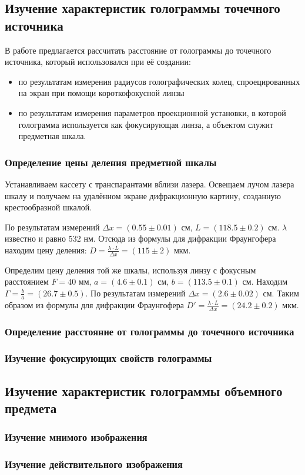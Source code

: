 
\subsection{Изучение характеристик голограммы точечного источника}

    В работе предлагается рассчитать расстояние от голограммы до точечного источника, 
    который использовался при её создании:
    \begin{itemize}
        \item по результатам измерения радиусов голографических колец,
                спроецированных на экран при помощи короткофокусной линзы
        \item по результатам измерения параметров проекционной установки, 
                в которой голограмма используется как фокусирующая линза, 
                а объектом служит предметная шкала.
    \end{itemize}

    \subsubsection*{Определение цены деления предметной шкалы}

        Устанавливаем кассету с транспарантами вблизи лазера. Освещаем лучом лазера шкалу и 
        получаем на удалённом экране дифракционную картину, созданную крестообразной шкалой.

        По результатам измерений $\Delta x = (0.55 \pm 0.01)$ см, $L = (118.5 \pm 0.2)$ см.
        $\lambda$ известно и равно $532$ нм. Отсюда из формулы для дифракции Фраунгофера
        находим цену деления: $D = \frac{\lambda \cdot L}{\Delta x} = (115 \pm 2)$ мкм.

        Определим цену деления той же шкалы, используя линзу с фокусным расстоянием
        $F = 40$ мм, $a = (4.6 \pm 0.1)$ см, $b = (113.5 \pm 0.1)$ см. Находим
        $\Gamma = \frac{b}{a} = (26.7 \pm 0.5)$. По результатам измерений
        $\Delta x = (2.6 \pm 0.02)$ см. Таким образом из формулы для дифракции Фраунгофера
        $D' = \frac{\lambda \cdot L}{\Delta x} = (24.2 \pm 0.2)$ мкм.

    \subsubsection*{Определение расстояние от голограммы до точечного источника}

    \subsubsection*{Изучение фокусирующих свойств голограммы}

\subsection{Изучение характеристик голограммы объемного предмета}

    \subsubsection*{Изучение мнимого изображения}

    \subsubsection*{Изучение действительного изображения}

